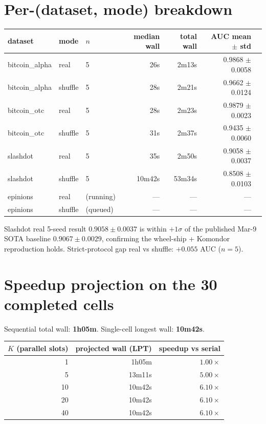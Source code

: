 \documentclass[11pt,a4paper]{article}
\begin{document}
\section{Per-(dataset, mode) breakdown}

\begin{center}
\small
\begin{tabular}{lllrrrl}
\toprule
dataset & mode & $n$ & median wall & total wall & AUC mean $\pm$ std \\
\midrule
bitcoin\_alpha & real & 5 & 26s & 2m13s & 0.9868 $\pm$ 0.0058 \\
bitcoin\_alpha & shuffle & 5 & 28s & 2m21s & 0.9662 $\pm$ 0.0124 \\
bitcoin\_otc & real & 5 & 28s & 2m23s & 0.9879 $\pm$ 0.0023 \\
bitcoin\_otc & shuffle & 5 & 31s & 2m37s & 0.9435 $\pm$ 0.0060 \\
slashdot & real & 5 & 35s & 2m50s & 0.9058 $\pm$ 0.0037 \\
slashdot & shuffle & 5 & 10m42s & 53m34s & 0.8508 $\pm$ 0.0103 \\
epinions & real & (running) & --- & --- & --- \\
epinions & shuffle & (queued) & --- & --- & --- \\
\bottomrule
\end{tabular}
\end{center}

Slashdot real 5-seed result $0.9058 \pm 0.0037$ is within $+1\sigma$
of the published Mar-9 SOTA baseline $0.9067 \pm 0.0029$, confirming
the wheel-ship + Komondor reproduction holds. Strict-protocol gap
real vs shuffle: $+0.055$ AUC ($n=5$).

\section{Speedup projection on the 30 completed cells}

Sequential total wall: \textbf{1h05m}.
Single-cell longest wall: \textbf{10m42s}.

\begin{center}
\begin{tabular}{rrr}
\toprule
$K$ (parallel slots) & projected wall (LPT) & speedup vs serial \\
\midrule
1  & 1h05m   & $1.00\times$ \\
5  & 13m11s  & $5.00\times$ \\
10 & 10m42s  & $6.10\times$ \\
20 & 10m42s  & $6.10\times$ \\
40 & 10m42s  & $6.10\times$ \\
\bottomrule
\end{tabular}
\end{center}
\end{document}
